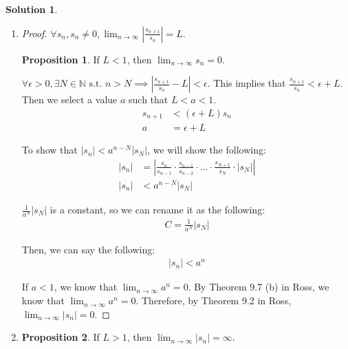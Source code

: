 \documentclass[12pt]{article}
\theoremstyle{definition} %
\newtheorem{solution}{Solution}
\newtheorem*{proposition}{Proposition}
\theoremstyle{plain} %
\begin{document}
\begin{solution}
    \begin{enumerate}
        \item \begin{proof}
        $\forall s_n, s_n \neq 0, \lim_{n \to \infty} \left| \frac{s_{n+1}}{s_n} \right| = L.$
    
        \begin{proposition}
             If $L < 1$, then $\lim_{n \to \infty} s_n = 0.$
        \end{proposition}
    
        $\forall \epsilon > 0, \exists N \in \mathbb{N} \text{ s.t. } n > N \implies \left| \frac{s_{n+1}}{s_n} - L \right| < \epsilon.$
        This implies that $\frac{s_{n+1}}{s_n} < \epsilon + L.$ Then we select a value $a$ such that $L < a < 1.$
        \begin{align}
            s_{n+1} &< (\epsilon + L) s_n \tag{1} \\
            a &= \epsilon + L \tag{2}
        \end{align}
    
        To show that $|s_n| < a^{n-N} |s_N|$, we will show the following:
        \begin{align}
            |s_n| &= \left| \frac{s_n}{s_{n-1}} \cdot \frac{s_{n-1}}{s_{n-2}} \cdot \dots \cdot \frac{s_{N+1}}{s_N} \cdot |s_N| \right| \tag{4} \\
            |s_n| &< a^{n-N} |s_N| \tag{5}
        \end{align}
    
        $\frac{1}{a^N} |s_N|$ is a constant, so we can rename it as the following:
        \begin{align}
            C = \frac{1}{a^N} |s_N| \tag{6}
        \end{align}
    
        Then, we can say the following:
        \begin{align}
            |s_n| < a^n \tag{7}
        \end{align}
    
        If $a < 1$, we know that $\lim_{n \to \infty} a^n = 0.$ By Theorem 9.7 (b) in Ross, we know that $\lim_{n \to \infty} a^n = 0.$
        Therefore, by Theorem 9.2 in Ross, $\lim_{n \to \infty} |s_n| = 0.$ 
    \end{proof}
\item    \begin{proposition}
         If $L > 1$, then $\lim_{n \to \infty} |s_n| = \infty.$
    \end{proposition}
    

\end{enumerate}
\end{solution}
\end{document}
